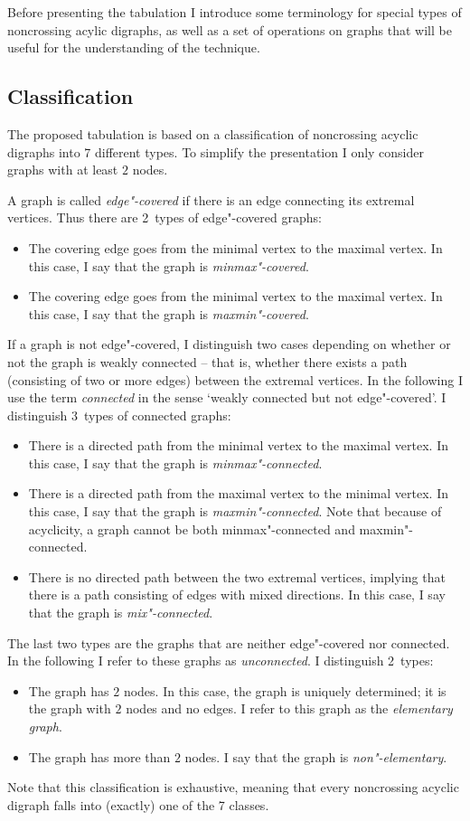 \documentclass[a4paper]{article}
\begin{document}
Before presenting the tabulation I introduce some terminology for
special types of noncrossing acylic digraphs, as well as a set of
operations on graphs that will be useful for the understanding of the
technique.

\subsection{Classification}
\label{sec:Classification}

The proposed tabulation is based on a classification of noncrossing
acyclic digraphs into 7 different types.
To simplify the presentation I only consider graphs with at least $2$
nodes.

A graph is called \emph{edge"-covered} if there is an edge connecting
its extremal vertices.
Thus there are 2~types of edge"-covered graphs:
\begin{itemize}
\item The covering edge goes from the minimal vertex to the maximal
  vertex.
  In this case, I say that the graph is \emph{minmax"-covered}.
\item The covering edge goes from the minimal vertex to the maximal
  vertex.
  In this case, I say that the graph is \emph{maxmin"-covered}.
\end{itemize}
If a graph is not edge"-covered, I distinguish two cases depending on
whether or not the graph is weakly connected -- that is, whether there
exists a path (consisting of two or more edges) between the extremal
vertices.
In the following I use the term \emph{connected} in the sense `weakly
connected but not edge"-covered'.
I distinguish 3~types of connected graphs:
\begin{itemize}
\item There is a directed path from the minimal vertex to the maximal
  vertex.
  In this case, I say that the graph is \emph{minmax"-connected}.
\item There is a directed path from the maximal vertex to the minimal
  vertex.
  In this case, I say that the graph is \emph{maxmin"-connected}.
  Note that because of acyclicity, a graph cannot be both
  minmax"-connected and maxmin"-connected.
\item There is no directed path between the two extremal vertices,
  implying that there is a path consisting of edges with mixed
  directions.
  In this case, I say that the graph is \emph{mix"-connected}.
\end{itemize}
The last two types are the graphs that are neither edge"-covered nor
connected.
In the following I refer to these graphs as \emph{unconnected}.
I distinguish 2~types:
\begin{itemize}
\item The graph has $2$ nodes.
  In this case, the graph is uniquely determined; it is the graph with
  $2$ nodes and no edges.
  I refer to this graph as the \emph{elementary graph}.
\item The graph has more than $2$ nodes.
  I say that the graph is \emph{non"-elementary}.
\end{itemize}
Note that this classification is exhaustive, meaning that every
noncrossing acyclic digraph falls into (exactly) one of the 7 classes.
\end{document}

